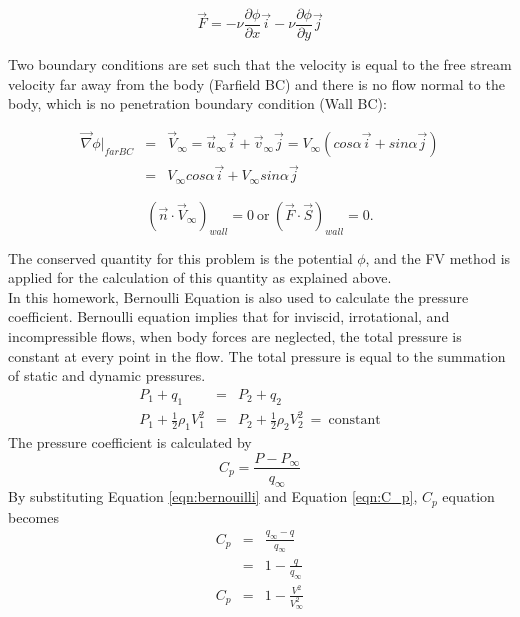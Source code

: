 \documentclass[letterpaper,12pt]{article}
\begin{document}
\begin{equation}
	\vec{F} = -\nu\frac{\partial \phi}{\partial x}\vec{i} - \nu\frac{\partial \phi}{\partial y}\vec{j}
\end{equation}

Two boundary conditions are set such that the velocity is equal to the free stream velocity
far away from the body (Farfield BC) and there is no flow normal to the body, which is no
penetration boundary condition (Wall BC):

\begin{eqnarray}
	\vec{\nabla}\phi|_{far BC} &=& \vec{V}_{\infty} = \vec{u}_{\infty}\vec{i} + \vec{v}_{\infty}\vec{j} = V_{\infty}(cos\alpha\vec{i}+sin\alpha\vec{j})\\
	&=& V_{\infty}cos\alpha\vec{i} + V_{\infty}sin\alpha\vec{j}
\end{eqnarray}

\begin{equation}
	(\vec{n}\cdot\vec{V}_{\infty})_{wall} = 0 \:\mbox{or}\: (\vec{F}\cdot\vec{S})_{wall} = 0.
\end{equation}

The conserved quantity for this problem is the potential $\phi$, and the FV method is applied
for the calculation of this quantity as explained above.\\
\newpage
In this homework, Bernoulli Equation is also used to calculate the pressure coefficient. Bernoulli equation
implies that for inviscid, irrotational, and incompressible flows, when body forces are neglected,
the total pressure is constant at every point in the flow. The total pressure is equal to the summation of 
static and dynamic pressures.
\begin{eqnarray}
	P_1+q_1&=&P_2+q_2 \nonumber \\
	P_1+\frac{1}{2}\rho_1V_{1}^{2}&=&P_2+\frac{1}{2}\rho_2V_{2}^{2}\:=\:\mbox{constant}
	\label{eqn:bernouilli}
\end{eqnarray}
The pressure coefficient is calculated by
\begin{equation}
C_p=\frac{P-P_\infty}{q_\infty}
	\label{eqn:C_p}
\end{equation}
By substituting Equation \ref{eqn:bernouilli} and Equation \ref{eqn:C_p}, $C_p$ equation becomes
\begin{eqnarray}
	C_p&=&\frac{q_\infty-q}{q_{\infty}} \nonumber \\
	&=&1-\frac{q}{q_{\infty}}   \nonumber \\
	C_p&=&1-\frac{V^2}{V_{\infty}^{2}} 
	\label{eqn:C_p_new}
\end{eqnarray}
\end{document}
